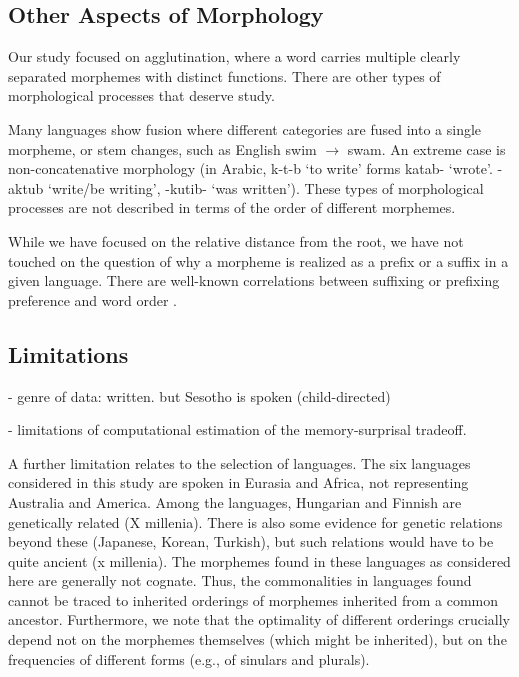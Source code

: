 \documentclass[11pt,letterpaper]{article}
\newcommand{\citep}{\parencite}
\begin{document}







\subsection{Other Aspects of Morphology}

Our study focused on agglutination, where a word carries multiple clearly separated morphemes with distinct functions.
There are other types of morphological processes that deserve study.

Many languages show fusion where different categories are fused into a single morpheme, or stem changes, such as English swim $\rightarrow$ swam.
An extreme case is non-concatenative morphology (in Arabic, k-t-b `to write' forms katab- `wrote'. -aktub `write/be writing', -kutib- `was written').
These types of morphological processes are not described in terms of the order of different morphemes.


While we have focused on the relative distance from the root, we have not touched on the question of why a morpheme is realized as a prefix or a suffix in a given language.
There are well-known correlations between suffixing or prefixing preference and word order \citep{greenberg1963universals}.




\subsection{Limitations}

- genre of data: written. but Sesotho is spoken (child-directed)

- limitations of computational estimation of the memory-surprisal tradeoff. %


A further limitation relates to the selection of languages.
The six languages considered in this study are spoken in Eurasia and Africa, not representing Australia and America.
Among the languages, Hungarian and Finnish are genetically related (X millenia).
There is also some evidence for genetic relations beyond these (Japanese, Korean, Turkish), but such relations would have to be quite ancient (x millenia).
The morphemes found in these languages as considered here are generally not cognate.
Thus, the commonalities in languages found cannot be traced to inherited orderings of morphemes inherited from a common ancestor.
Furthermore, we note that the optimality of different orderings crucially depend not on the morphemes themselves (which might be inherited), but on the frequencies of different forms (e.g., of sinulars and plurals).
\end{document}
